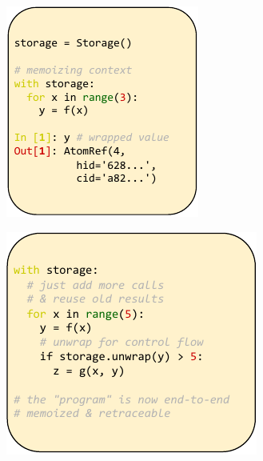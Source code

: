 \documentclass{article} %
\begin{document}
\begin{figure}[h]
\begin{subfigure}{0.35\textwidth}
\includegraphics[width=\textwidth]{img/fig2.pdf}
\caption{}
\end{subfigure}
\begin{subfigure}{0.4\textwidth}
\centering
\includegraphics[width=\textwidth]{img/fig3.pdf}

\end{subfigure}
\end{figure}
\end{document}
